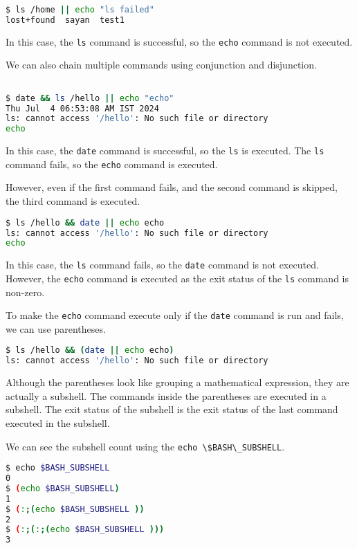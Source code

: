 \begin{lstlisting}[language=bash]
$ ls /home || echo "ls failed"
lost+found  sayan  test1
\end{lstlisting}

In this case, the \lstinline|ls| command is successful, so the \lstinline|echo|
command is not executed.

We can also chain multiple commands using conjunction and disjunction.

\begin{lstlisting}[language=bash]

$ date && ls /hello || echo "echo"
Thu Jul  4 06:53:08 AM IST 2024
ls: cannot access '/hello': No such file or directory
echo
\end{lstlisting}

In this case, the \lstinline|date| command is successful, so the \lstinline|ls|
is executed. The \lstinline|ls| command fails, so the \lstinline|echo| command
is executed.

However, even if the first command fails, and the second command is
skipped, the third command is executed.

\begin{lstlisting}[language=bash]
$ ls /hello && date || echo echo
ls: cannot access '/hello': No such file or directory
echo
\end{lstlisting}

In this case, the \lstinline|ls| command fails, so the \lstinline|date| command
is not executed. However, the \lstinline|echo| command is executed as the
exit status of the \lstinline|ls| command is non-zero.

To make the \lstinline|echo| command execute only if the \lstinline|date|
command is run and fails, we can use parentheses.

\begin{lstlisting}[language=bash]
$ ls /hello && (date || echo echo)
ls: cannot access '/hello': No such file or directory
\end{lstlisting}

Although the parentheses look like grouping a mathematical expression,
they are actually a subshell. The commands inside the parentheses
are executed in a subshell. The exit status of the subshell is the
exit status of the last command executed in the subshell.

We can see the subshell count using the \lstinline|echo \$BASH\_SUBSHELL|.

\begin{lstlisting}[language=bash]
$ echo $BASH_SUBSHELL
0
$ (echo $BASH_SUBSHELL)
1
$ (:;(echo $BASH_SUBSHELL ))
2
$ (:;(:;(echo $BASH_SUBSHELL )))
3
\end{lstlisting}

